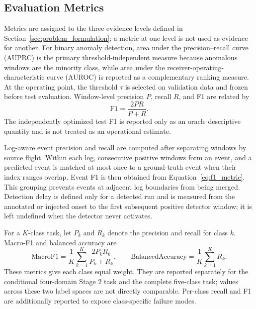 \subsection{Evaluation Metrics}
\label{sec:evaluation_metrics}

Metrics are assigned to the three evidence levels defined in Section~\ref{sec:problem_formulation}; a metric at one level is not used as evidence for another. For binary anomaly detection, area under the precision--recall curve (AUPRC) is the primary threshold-independent measure because anomalous windows are the minority class, while area under the receiver-operating-characteristic curve (AUROC) is reported as a complementary ranking measure. At the operating point, the threshold $\tau$ is selected on validation data and frozen before test evaluation. Window-level precision $P$, recall $R$, and F1 are related by
\begin{equation}
\mathrm{F1}=\frac{2PR}{P+R}.
\label{eq:f1_metric}
\end{equation}
The independently optimized test F1 is reported only as an oracle descriptive quantity and is not treated as an operational estimate.

Log-aware event precision and recall are computed after separating windows by source flight. Within each log, consecutive positive windows form an event, and a predicted event is matched at most once to a ground-truth event when their index ranges overlap. Event F1 is then obtained from Equation~\eqref{eq:f1_metric}. This grouping prevents events at adjacent log boundaries from being merged. Detection delay is defined only for a detected run and is measured from the annotated or injected onset to the first subsequent positive detector window; it is left undefined when the detector never activates.

For a $K$-class task, let $P_k$ and $R_k$ denote the precision and recall for class $k$. Macro-F1 and balanced accuracy are
\begin{equation}
\mathrm{MacroF1}=\frac{1}{K}\sum_{k=1}^{K}\frac{2P_kR_k}{P_k+R_k},
\qquad
\mathrm{BalancedAccuracy}=\frac{1}{K}\sum_{k=1}^{K}R_k.
\label{eq:multiclass_metrics}
\end{equation}
These metrics give each class equal weight. They are reported separately for the conditional four-domain Stage 2 task and the complete five-class task; values across these two label spaces are not directly comparable. Per-class recall and F1 are additionally reported to expose class-specific failure modes.

